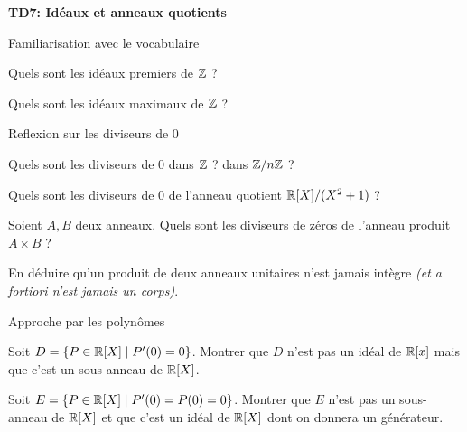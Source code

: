 \documentclass{report}
\begin{document}
\begin{center}
    \huge{\textbf{TD7: Idéaux et anneaux quotients}}
\end{center}

\begin{exo} Familiarisation avec le vocabulaire
    \begin{q}{1}
        Quels sont les idéaux premiers de \(\mathbb{Z}\) ?
    \end{q}
    \begin{q}{1}
        Quels sont les idéaux maximaux de \(\mathbb{Z}\) ?
    \end{q}
\end{exo}

\begin{exo} Reflexion sur les diviseurs de \(0\)
    \begin{q}{1}
        Quels sont les diviseurs de \(0\) dans \(\mathbb{Z}\) ? dans \(\mathbb{Z}/n\mathbb{Z}\) ?
    \end{q}
    \begin{q}{2}
        Quels sont les diviseurs de \(0\) de l'anneau quotient \(\mathbb{R}[X]/(X^2+1)\) ?
    \end{q}
    \begin{q}{3}
        Soient \(A,B\) deux anneaux. Quels sont les diviseurs de zéros de l'anneau
        produit \(A\times B\) ?
    \end{q}
    \begin{q}{4}
        En déduire qu'un produit de deux anneaux unitaires n'est jamais intègre
        \textit{(et a fortiori n'est jamais un corps)}.
    \end{q}
\end{exo}

\begin{exo} Approche par les polynômes
    \begin{q}{1}
        Soit \(D=\{P\in\mathbb{R}[X]\mid P'(0)=0\}\). Montrer que \(D\) n'est pas un idéal de
        \(\mathbb{R}[x]\) mais que c'est un sous-anneau de \(\mathbb{R}[X]\).
    \end{q}
    \begin{q}{2}
        Soit \(E=\{P\in\mathbb{R}[X]\mid P'(0)=P(0)=0\}\). Montrer que \(E\) n'est pas un
        sous-anneau de \(\mathbb{R}[X]\) et que c'est un idéal de \(\mathbb{R}[X]\) dont on
        donnera un générateur.
    \end{q}
\end{exo}
\end{document}

